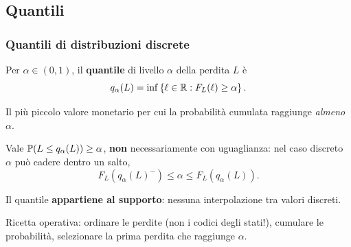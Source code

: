 

\subsection{Quantili}%

\begin{frame}%
%

\frametitle{Quantili di distribuzioni discrete}%
%

%


Per $\alpha\in(0,1)$, il \textbf{quantile} di livello $\alpha$ della perdita
$L$ \`{e}
\[
q_{\alpha}(L) = \inf\left\{  \ell\in\mathbb{R}: F_{L}(\ell)\geq\alpha\right\}  .
\]


\medskip

\begin{stepitemize}
\item Il pi\`{u} piccolo valore monetario per cui la probabilit\`{a} cumulata
raggiunge \emph{almeno} $\alpha$.

\item Vale $\mathbb{P}(L\leq q_{\alpha}(L))\geq\alpha$, \textbf{non}
necessariamente con uguaglianza: nel caso discreto $\alpha$ pu\`{o} cadere
dentro un salto,
\[
F_{L}\left(  q_{\alpha}(L)^{-}\right)  \leq\alpha\leq F_{L}\left(  q_{\alpha
}(L)\right)  .
\]


\item Il quantile \textbf{appartiene al supporto}: nessuna interpolazione tra
valori discreti.

\item Ricetta operativa: ordinare le perdite (non i codici degli stati!),
cumulare le probabilit\`{a}, selezionare la prima perdita che raggiunge
$\alpha$.
\end{stepitemize}

%

\transboxout
\end{frame}%




